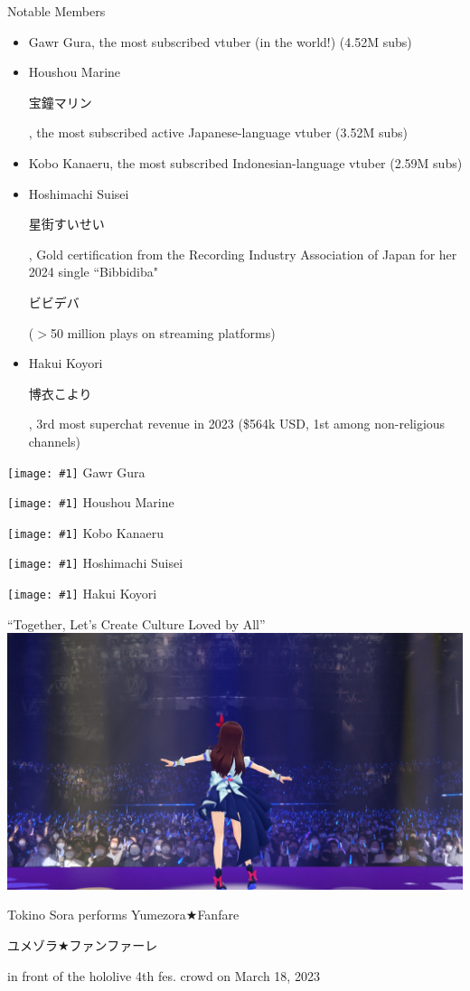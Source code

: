 \documentclass[aspectratio=169]{beamer}
\newcommand{\idolcaption}[2]{
    \begin{minipage}{0.15\textwidth}
        \texttt{[image: \#1]}
        \vspace{0.2em}
        \centering
        \tiny{#2}
    \end{minipage}
}
\begin{document}
\begin{frame}{Notable Members}
    \begin{itemize}
        \item Gawr Gura, the most subscribed vtuber (in the world!) (4.52M subs)
        \item Houshou Marine \begin{CJK}{UTF8}{min}宝鐘マリン\end{CJK}, the most subscribed active Japanese-language vtuber (3.52M subs)
        \item Kobo Kanaeru, the most subscribed Indonesian-language vtuber (2.59M subs)
        \item Hoshimachi Suisei \begin{CJK}{UTF8}{min}星街すいせい\end{CJK}, Gold certification from the Recording Industry Association of Japan for her 2024 single ``Bibbidiba" \begin{CJK}{UTF8}{min}ビビデバ\end{CJK} ($>$50 million plays on streaming platforms)
        \item Hakui Koyori \begin{CJK}{UTF8}{min}博衣こより\end{CJK}, 3rd most superchat revenue in 2023 (\$564k USD, 1st among non-religious channels)
    \end{itemize}
    \begin{center}
        \idolcaption{images/gura.png}{Gawr Gura}\hspace{0.01\textwidth}
        \idolcaption{images/marin.png}{Houshou Marine}\hspace{0.01\textwidth}
        \idolcaption{images/kobo.png}{Kobo Kanaeru}\hspace{0.01\textwidth}
        \idolcaption{images/suisex.png}{Hoshimachi Suisei}\hspace{0.01\textwidth}
        \idolcaption{images/koyori.png}{Hakui Koyori}
    \end{center}
\end{frame}

\begin{frame}{``Together, Let's Create Culture Loved by All''}
    \centering
    \includegraphics[width=.8\linewidth]{images/sora_performing.png}
    \vspace{0.2em}
    \parbox{\linewidth}{\centering \tiny Tokino Sora performs Yumezora$\bigstar$Fanfare \begin{CJK}{UTF8}{min}ユメゾラ$\bigstar$ファンファーレ\end{CJK} in front of the hololive 4th fes. crowd on March 18, 2023}
\end{frame}
\end{document}
